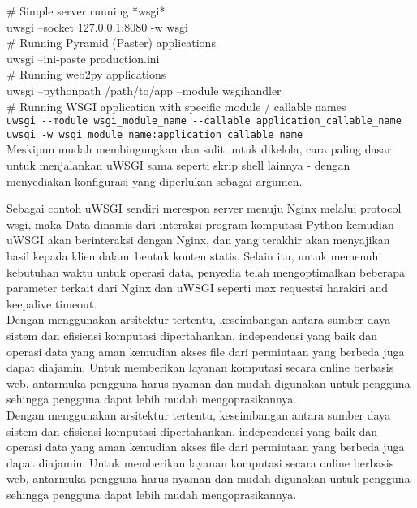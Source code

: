 \begin{enumerate}
\# Simple server running *wsgi*\\
uwsgi --socket 127.0.0.1:8080 -w wsgi\\

\# Running Pyramid (Paster) applications\\
uwsgi --ini-paste production.ini\\

\# Running web2py applications\\
uwsgi --pythonpath /path/to/app --module wsgihandler\\

\# Running WSGI application with specific module / callable names\\
\verb|uwsgi --module wsgi_module_name --callable application_callable_name|\\
\verb|uwsgi -w wsgi_module_name:application_callable_name|\\
Meskipun mudah membingungkan dan sulit untuk dikelola, cara paling dasar untuk menjalankan uWSGI sama seperti skrip shell lainnya - dengan menyediakan konfigurasi yang diperlukan sebagai argumen\cite{cencini2017data}.\\




\end{enumerate}
Sebagai contoh uWSGI sendiri merespon server menuju Nginx melalui protocol wsgi, maka Data dinamis dari interaksi program
komputasi Python kemudian uWSGI akan berinteraksi dengan Nginx, dan yang terakhir akan menyajikan hasil kepada klien dalam\
bentuk konten statis. Selain itu, untuk memenuhi kebutuhan waktu untuk operasi data, penyedia  telah mengoptimalkan beberapa
parameter terkait dari Nginx dan uWSGI seperti max requestsi harakiri and keepalive timeout.\\

	Dengan menggunakan arsitektur tertentu, keseimbangan antara sumber daya sistem dan efisiensi komputasi dipertahankan. independensi yang baik dan operasi data yang aman kemudian  akses file dari permintaan yang berbeda juga dapat diajamin. Untuk memberikan layanan komputasi secara online berbasis web, antarmuka pengguna harus nyaman dan mudah digunakan untuk pengguna sehingga pengguna dapat lebih mudah mengoprasikannya\cite{dong2015chemdes}.\\

	Dengan menggunakan arsitektur tertentu, keseimbangan antara sumber daya sistem dan efisiensi komputasi dipertahankan. independensi yang baik dan operasi data yang aman kemudian  akses file dari permintaan yang berbeda juga dapat diajamin. Untuk memberikan layanan komputasi secara online berbasis web, antarmuka pengguna harus nyaman dan mudah digunakan untuk pengguna sehingga pengguna dapat lebih mudah mengoprasikannya\cite{dong2015chemdes}.\\
	
